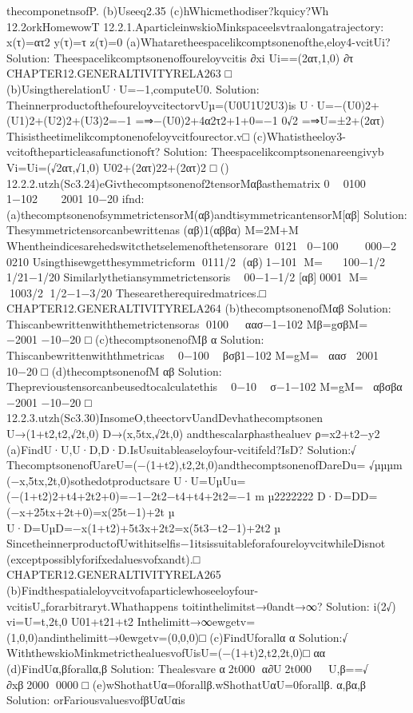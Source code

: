 {{{{{{{{{{{{{{{{thecomponetnsofP.
(b)Useeq2.35
(c)hWhicmethodiser?kquicy?Wh
12.2orkHomewowT
12.2.1.AparticleinwskioMinkspaceelsvtraalongatrajectory:
x(τ)=ατ2
y(τ)=τ
z(τ)=0
(a)Whataretheespacelikcomptsonenofthe,eloy4-vcitUi?
Solution:
Theespacelikcomptsonenoffoureloyvcitis
∂xi
Ui==(2ατ,1,0)
∂τ
CHAPTER12.GENERALTIVITYRELA263
□
(b)UsingtherelationU·U=−1,computeU0.
Solution:
TheinnerproductofthefoureloyvcitectorvUµ=(U0U1U2U3)is
U·U=−(U0)2+(U1)2+(U2)2+(U3)2=−1
=⇒−(U0)2+4α2τ2+1+0=−1
0√2
=⇒U=±2+(2ατ)
Thisistheetimelikcomptonenofeloyvcitfourector.v□
(c)Whatistheeloy3-vcitoftheparticleasafunctionofτ?
Solution:
Theespacelikcomptsonenareengivyb
Vi=Ui=(√2ατ,√1,0)
U02+(2ατ)22+(2ατ)2
□
()
12.2.2.utzh(Sc3.24)eGivthecomptsonenof2tensorMαβasthematrix
0

0100

1−102


2001
10−20
ifnd:
(a)thecomptsonenofsymmetrictensorM(αβ)andtisymmetricantensorM[αβ]
Solution:
Thesymmetrictensorcanbewrittenas
(αβ)1(αββα)
M=2M+M
Whentheindicesarehedswitcthetselemenofthetensorare
0121
0−100


000−2
0210
Usingthisewgetthesymmetricform
0111/2
(αβ)1−101
M=

100−1/2
1/21−1/20
Similarlythetiansymmetrictensoris

00−1−1/2
[αβ]0001
M=
1003/2
1/2−1−3/20
Thesearetherequiredmatrices.□
CHAPTER12.GENERALTIVITYRELA264
(b)thecomptsonenofMαβ
Solution:
Thiscanbewrittenwiththemetrictensoras
0100

αασ−1−102
Mβ=gσβM=

−2001
−10−20
□
(c)thecomptsonenofMβ
α
Solution:
Thiscanbewrittenwiththmetricas

0−100

βσβ1−102
M=gM=
αασ
2001
10−20
□
(d)thecomptsonenofM
αβ
Solution:
Theprevioustensorcanbeusedtocalculatethis

0−10

σ−1−102
M=gM=
αβσβα
−2001
−10−20
□
12.2.3.utzh(Sc3.30)InsomeO,theectorvUandDevhathecomptsonen
U→(1+t2,t2,√2t,0)
D→(x,5tx,√2t,0)
andthescalarρhasthealuev
ρ=x2+t2−y2
(a)FindU·U,U·D,D·D.IsUsuitableaseloyfour-vcitifeld?IsD?
Solution:√
ThecomptsonenofUareU=(−(1+t2),t2,2t,0)andthecomptsonenofDareDu=
√µµµm
(−x,5tx,2t,0)sothedotproductsare
U·U=UµUu=(−(1+t2)2+t4+2t2+0)=−1−2t2−t4+t4+2t2=−1
m
µ2222222
D·D=DD=(−x+25tx+2t+0)=x(25t−1)+2t
µ
U·D=UµD=−x(1+t2)+5t3x+2t2=x(5t3−t2−1)+2t2
µ
SincetheinnerproductofUwithitselfis−1itsissuitableforafoureloyvcitwhileDisnot
(exceptpossiblyforifxedaluesvofxandt).□
CHAPTER12.GENERALTIVITYRELA265
(b)Findthespatialeloyvcitvofaparticlewhoseeloyfour-vcitisU„forarbitraryt.Whathappens
toitinthelimitst→0andt→∞?
Solution:
i(2√)
vi=U=t,2t,0
U01+t21+t2
Inthelimitt→∞ewgetv=(1,0,0)andinthelimitt→0ewgetv=(0,0,0)□
(c)FindUforallα
α
Solution:√
WiththewskioMinkmetricthealuesvofUisU=(−(1+t)2,t2,2t,0)□
αα
(d)FindUα,βforallα,β
Solution:
Thealesvare
α2t000
α∂U2t000

U,β==√
∂xβ2000
0000
□
(e)wShothatUα=0forallβ.wShothatUαU=0forallβ.
α,βα,β
Solution:
orFariousvaluesvofβUαUαis
}}}}}}}}}}}}}}}}
